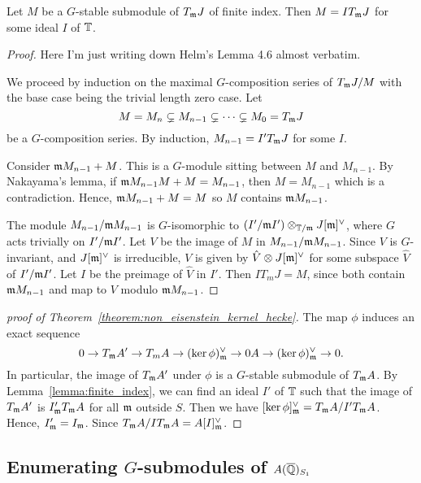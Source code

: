 \documentclass{article}
\begin{document}
\begin{lemma}\label{lemma:finite_index}
    Let $M$ be a $G$-stable submodule of $T_{\mathfrak{m}} J$ of finite index. Then
    $M=IT_{\mathfrak{m}} J$ for some ideal $I$ of $\mathbb{T}$.
\end{lemma}
\begin{proof}
    Here I'm just writing down Helm's Lemma 4.6 almost verbatim.

    We proceed by induction on the maximal $G$-composition series of $T_{\mathfrak{m}} J/M$
    with the base case being the trivial length zero case. Let 
    \[
        M = M_n \subsetneq M_{n-1} \subsetneq \cdots \subsetneq M_0 = T_{\mathfrak{m}} J
    \]
    be a $G$-composition series. By induction, $M_{n-1} = I'T_{\mathfrak{m}} J$ for some
    $I$.

    Consider $\mathfrak{m} M_{n-1} + M$. This is a $G$-module sitting between $M$ and
    $M_{n-1}$. By Nakayama's lemma, if $\mathfrak{m} M_{n-1} M + M = M_{n-1}$, then
    $M=M_{n-1}$ which is a contradiction. Hence, $\mathfrak{m} M_{n-1}+M=M$ so $M$
    contains $\mathfrak{m} M_{n-1}$.

    The module $M_{n-1}/\mathfrak{m} M_{n-1}$ is $G$-isomorphic to $(I'/\mathfrak{m} I')\otimes_{\mathbb{T}/\mathfrak{m}}
    J[\mathfrak{m}]^\vee$, where $G$ acts trivially on $I'/\mathfrak{m} I'$. Let $V$ be the image
    of $M$ in $M_{n-1}/\mathfrak{m} M_{n-1}$. Since $V$ is $G$-invariant, and
    $J[\mathfrak{m}]^\vee$ is irreducible, $V$ is given by $\hat{V}\otimes J[\mathfrak{m}]^\vee$
    for some subspace $\hat{V}$ of $I'/\mathfrak{m} I'$. Let $I$ be the preimage of
    $\hat{V}$ in $I'$. Then $IT_m J = M$, since both contain $\mathfrak{m} M_{n-1}$ and
    map to $V$ modulo $\mathfrak{m} M_{n-1}$.
\end{proof}

\begin{proof}[proof of Theorem~\ref{theorem:non_eisenstein_kernel_hecke}]
    The map $\phi$ induces an exact sequence
    \[
        0 \to T_{\mathfrak{m}} A' \to T_m A \to (\ker \phi)^\vee _{\mathfrak{m}} 
        \to 0 A \to (\ker \phi)^\vee _{\mathfrak{m}} \to 0.
    \]
    In particular, the image of $T_{\mathfrak{m}} A'$ under $\phi$ is a $G$-stable
    submodule of $T_{\mathfrak{m}} A$. By Lemma~\ref{lemma:finite_index}, we can find an
    ideal $I'$ of $\mathbb{T}$ such that the image of $T_{\mathfrak{m}} A'$ is $I' _{\mathfrak{m}} T_{\mathfrak{m}} A$ for
    all $\mathfrak{m}$ outside $S$. Then we have $[\ker \phi]^\vee _{\mathfrak{m}} = T_{\mathfrak{m}} A / I' T_{\mathfrak{m}}
    A$. Hence, $I' _{\mathfrak{m}} = I_{\mathfrak{m}}$. Since $T_{\mathfrak{m}} A/IT_{\mathfrak{m}} A= A[I]_{\mathfrak{m}} ^\vee$.
\end{proof}

\subsection{Enumerating $G$-submodules of $A(\overline{\mathbb{Q}})_{S_1}$}%
\end{document}
